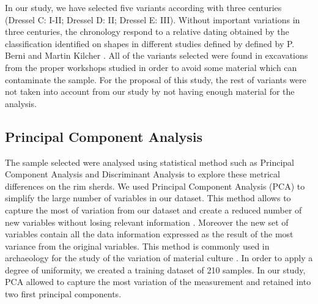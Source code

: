 \documentclass[review]{elsarticle}
\begin{document}
In our study, we have selected five variants according with three centuries
(Dressel C: I-II; Dressel D: II; Dressel E: III). Without important variations in three centuries, the chronology respond to a relative dating obtained by the classification identified on shapes in different studies defined by defined by P. Berni \citep{berni_millet_epigrafianforica_2008} and Martin Kilcher \citep{martin-kilcher_romischen_1994}. All of the variants selected were found in excavations from the proper workshops studied in order to avoid some material which can contaminate the sample. For the proposal of this study, the rest of variants were not taken into account from our study by not having enough material for the analysis. 


\subsection{Principal Component Analysis}

The sample selected were analysed using statistical method such as Principal Component Analysis and Discriminant Analysis to explore these metrical differences on the rim sherds.
We used Principal Component Analysis (PCA) to simplify the large number of variables in our dataset. This method allows to capture the most of variation from our dataset and create a reduced number of new variables without losing relevant information \citep{jolliffe_principal_2002, shennan_quantifying_1997}. Moreover the new set of variables contain all the data information expressed as the result of the most variance from the original variables. This method is commonly used in archaeology for the study of the variation of material culture \citep{li_crossbows_2014, schillinger_differences_2016}. In order to apply a degree of uniformity, we created a training dataset of 210 samples. In our study, PCA allowed to capture the most variation of the measurement and retained into two first principal components. 

\end{document}
